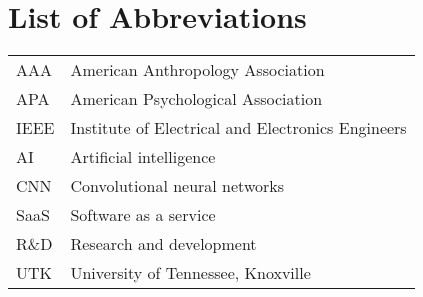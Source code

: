 \chapter*{List of Abbreviations} \label{abbreviations}

\begin{tabular}{@{}C{1in} L{4.5in}}
AAA & American Anthropology Association \\
APA & American Psychological Association \\
IEEE & Institute of Electrical and Electronics Engineers \\
AI & Artificial intelligence \\
CNN & Convolutional neural networks \\
SaaS & Software as a service \\
R\&D & Research and development \\
UTK & University of Tennessee, Knoxville \\
\end{tabular}
